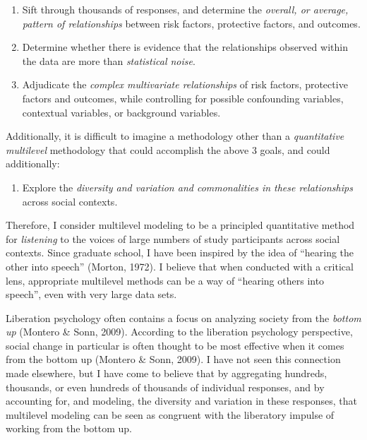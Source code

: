 \documentclass[
  letterpaper,
  DIV=11,
  numbers=noendperiod]{scrreprt}
\providecommand{\tightlist}{%
  \setlength{\itemsep}{0pt}\setlength{\parskip}{0pt}}\usepackage{longtable,booktabs,array}
\begin{document}
\begin{enumerate}
\def\labelenumi{\arabic{enumi}.}
\tightlist
\item
  Sift through thousands of responses, and determine the \emph{overall,
  or average, pattern of relationships} between risk factors, protective
  factors, and outcomes.
\item
  Determine whether there is evidence that the relationships observed
  within the data are more than \emph{statistical noise}.
\item
  Adjudicate the \emph{complex multivariate relationships} of risk
  factors, protective factors and outcomes, while controlling for
  possible confounding variables, contextual variables, or background
  variables.
\end{enumerate}

Additionally, it is difficult to imagine a methodology other than a
\emph{quantitative multilevel} methodology that could accomplish the
above 3 goals, and could additionally:

\begin{enumerate}
\def\labelenumi{\arabic{enumi}.}
\setcounter{enumi}{3}
\tightlist
\item
  Explore the \emph{diversity and variation and commonalities in these
  relationships} across social contexts. 
\end{enumerate}

Therefore, I consider multilevel modeling to be a principled
quantitative method for \emph{listening} to the voices of large numbers
of study participants across social contexts.  Since
graduate school, I have been inspired by the idea of ``hearing the other
into speech'' (Morton, 1972). I believe that when conducted with a
critical lens, appropriate multilevel methods can be a way of ``hearing
others into speech'', even with very large data sets.

Liberation psychology often contains a focus on analyzing society from
the \emph{bottom up} (Montero \& Sonn, 2009). According to the
liberation psychology perspective, social change in particular is often
thought to be most effective when it comes from the bottom up (Montero
\& Sonn, 2009). I have not seen this connection made elsewhere, but I
have come to believe that by aggregating hundreds, thousands, or even
hundreds of thousands of individual responses, and by accounting for,
and modeling, the diversity and variation in these responses, that
multilevel modeling can be seen as congruent with the liberatory impulse
of working from the bottom up. 
\end{document}

